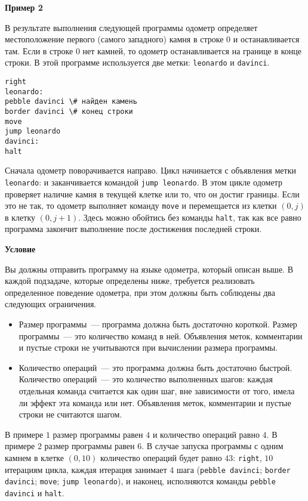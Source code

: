 \textbf{Пример 2}

В результате выполнения следующей программы одометр определяет местоположение
первого (самого западного) камня в строке $0$ и останавливается там. Если в строке $0$ нет
камней, то одометр останавливается на границе в конце строки. В этой программе
используется две метки: \texttt{leonardo} и \texttt{davinci}.

\begin{lstlisting}
right
leonardo:
pebble davinci \# найден камень
border davinci \# конец строки
move
jump leonardo
davinci:
halt
\end{lstlisting}

Сначала одометр поворачивается направо. Цикл начинается с объявления метки
\texttt{leonardo}: и заканчивается командой \texttt{jump leonardo}. В этом цикле одометр
проверяет наличие камня в текущей клетке или то, что он достиг границы. Если это не
так, то одометр выполняет команду \texttt{move} и перемещается из клетки $(0, j)$ в клетку $(0, j + 1)$. Здесь можно обойтись без команды \texttt{halt}, так как все равно программа закончит
выполнение после достижения последней строки.

\textbf{Условие}

Вы должны отправить программу на языке одометра, который описан выше. В каждой
подзадаче, которые определены ниже, требуется реализовать определенное поведение
одометра, при этом должны быть соблюдены два следующих ограничения.
\begin{itemize}
\item Размер программы~--- программа должна быть достаточно короткой. Размер
программы~--- это количество команд в ней. Объявления меток, комментарии и
пустые строки не учитываются при вычислении размера программы.
\item Количество операций~--- это программа должна быть достаточно быстрой.
Количество операций~--- это количество выполненных шагов: каждая отдельная
команда считается как один шаг, вне зависимости от того, имела ли эффект эта
команда или нет. Объявления меток, комментарии и пустые строки не считаются
шагом.
\end{itemize}

В примере $1$ размер программы равен $4$ и количество операций равно $4$. В примере $2$
размер программы равен $6$. В случае запуска программы с одним камнем в клетке $(0, 10)$
количество операций будет равно $43$: \texttt{right}, $10$ итерациям цикла, каждая итерация
занимает $4$ шага (\texttt{pebble davinci}; \texttt{border davinci}; \texttt{move}; \texttt{jump leonardo}), и
наконец, исполняются команды \texttt{pebble davinci} и \texttt{halt}.



